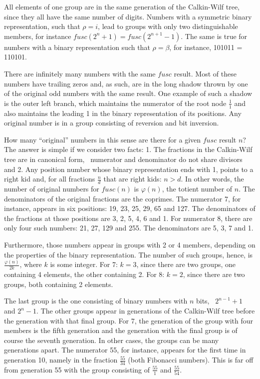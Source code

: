 \documentclass[tikz]{scrreprt}
\newcommand{\Varid}[1]{\mathit{#1}}
\begin{document}
All elements of one group are in the same generation
of the Calkin-Wilf tree,
since they all have the same number of digits.
Numbers with a symmetric binary representation,
such that $\rho = i$, lead to groups with only 
two distinguishable members, for instance
$fusc(2^n+1) = fusc(2^{n+1}-1)$.
The same is true for numbers with a binary representation
such that $\rho = \beta$, for instance, 
101011 = 110101.

There are infinitely many numbers
with the same \ensuremath{\Varid{fusc}} result.
Most of these numbers have trailing zeros
and, as such, are in the long shadow thrown 
by one of the original odd numbers with the same result.
One example of such a shadow is the outer left branch,
which maintains the numerator of the root node $\frac{1}{1}$
and also maintains the leading 1 in the binary representation
of its positions. 
Any original number is in a group 
consisting of reversion and bit inversion.

How many ``original'' numbers in this sense are there
for a given \ensuremath{\Varid{fusc}} result $n$?
The answer is simple if we consider two facts:
1. The fractions in the Calkin-Wilf tree are in
canonical form, \ie\ numerator and denominator
do not share divisors and
2. Any position number whose binary representation
ends with 1, points to a right kid and, for all fractions
$\frac{n}{d}$ that are right kids:
$n > d$.
In other words, the number of original numbers
for $fusc(n)$ is $\varphi(n)$, the totient number of $n$.
The denominators of the original fractions are 
the coprimes.
The numerator 7, for instance, appears in six positions:
19, 23, 25, 29, 65 and 127.
The denominators of the fractions at those positions are
3, 2, 5, 4, 6 and 1.
For numerator 8, there are only four such numbers:
21, 27, 129 and 255.
The denominators are 5, 3, 7 and 1.

Furthermore, those numbers appear in groups
with 2 or 4 members, depending on the properties 
of the binary representation. The number of such groups,
hence, is $\frac{\varphi(n)}{2k}$, where $k$ is some integer.
For 7: $k=3$, since there are two groups,
one containing 4 elements, the other containing 2.
For 8: $k=2$, since there are two groups, both containing 2 elements.

The last group is the one consisting of
binary numbers with $n$ bits, \ie\ $2^{n-1}+1$ and $2^n-1$.
The other groups appear in generations of the Calkin-Wilf tree
before the generation with that final group.
For 7, the generation of the group
with four members is the fifth generation and
the generation with the final group is of course the seventh generation.
In other cases,
the groups can be many generations apart.
The numerator 55, for instance, appears for the first time
in generation 10, namely in the fraction $\frac{55}{34}$
(both Fibonacci numbers).
This is far off from generation 55 
with the group consisting of $\frac{55}{1}$ and $\frac{55}{54}$.
\end{document}
